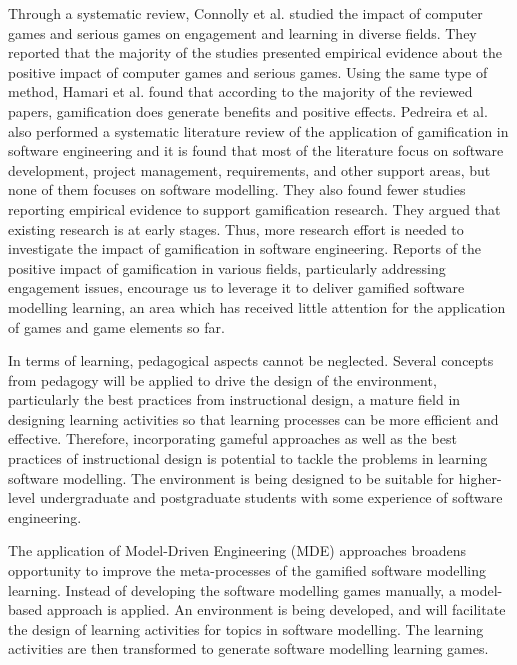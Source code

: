\documentclass[12pt, a4paper]{report} \usepackage[titletoc]{appendix}
\begin{document}
Through a systematic review, Connolly et al. \cite{connolly2012systematic} studied the impact of computer games and serious games on engagement and learning in diverse fields. They reported that the majority of the studies presented empirical evidence about the positive impact of computer games and serious games. Using the same type of method, Hamari et al. \cite{hamari2014does} found that according to the majority of the reviewed papers, gamification does generate benefits and positive effects. Pedreira et al. \cite{Pedreira2015} also performed a systematic literature review of the application of gamification in software engineering and it is found that most of the literature focus on software development, project management, requirements, and other support areas, but none of them focuses on software modelling. They also found fewer studies reporting empirical evidence to support gamification research. They argued that existing research is at early stages. Thus, more research effort is needed to investigate the impact of gamification in software engineering. Reports of the positive impact of gamification in various fields, particularly addressing engagement issues, encourage us to leverage it to deliver gamified software modelling learning, an area which has received little attention for the application of games and game elements so far. 

In terms of learning, pedagogical aspects cannot be neglected. Several concepts from pedagogy will be applied to drive the design of the environment, particularly the best practices from instructional design, a mature field in designing learning activities so that learning processes can be more efficient and effective. Therefore, incorporating gameful approaches as well as the best practices of instructional design is potential to tackle the problems in learning software modelling. The environment is being designed to be suitable for higher-level undergraduate and postgraduate students with some experience of software engineering. 

The application of Model-Driven Engineering (MDE) approaches broadens opportunity to improve the meta-processes of the gamified software modelling learning. Instead of developing the software modelling games manually, a model-based approach is applied. An environment is being developed, and will facilitate the design of learning activities for topics in software modelling. The learning activities are then transformed to generate software modelling learning games. 
\end{document}
